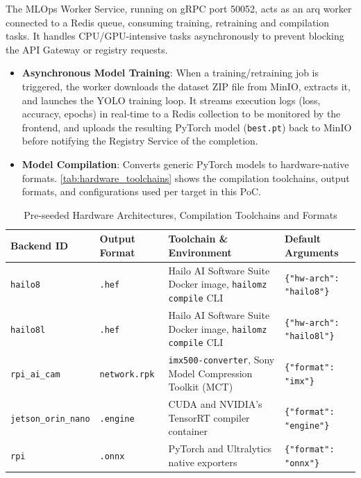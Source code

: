 The \gls{MLOps} Worker Service, running on \gls{gRPC} port 50052, acts as an arq worker connected to a Redis queue, consuming training, retraining and compilation tasks. It handles \gls{CPU}/\gls{GPU}-intensive tasks asynchronously to prevent blocking the \gls{API} Gateway or registry requests.

\begin{itemize}
    \item \textbf{Asynchronous Model Training}: When a training/retraining job is triggered, the worker downloads the dataset ZIP file from MinIO, extracts it, and launches the YOLO training loop. It streams execution logs (loss, accuracy, epochs) in real-time to a Redis collection to be monitored by the frontend, and uploads the resulting PyTorch model (\texttt{best.pt}) back to MinIO before notifying the Registry Service of the completion.
    
    \item \textbf{Model Compilation}: Converts generic PyTorch models to hardware-native formats. \autoref{tab:hardware_toolchains} shows the compilation toolchains, output formats, and configurations used per target in this \gls{PoC}.
\end{itemize}

\begin{table}[H]
    \centering
    \caption{Pre-seeded Hardware Architectures, Compilation Toolchains and Formats} 
    \label{tab:hardware_toolchains}
    \begin{tabular}{p{}
                    p{}
                    p{}
                    p{}}
        \hline
        \textbf{Backend \gls{ID}} & \textbf{Output Format} & \textbf{Toolchain \& Environment} & \textbf{Default Arguments} \\ \hline
        \texttt{hailo8} & \texttt{.hef} & Hailo \gls{AI} Software Suite Docker image, \texttt{hailomz compile} CLI & \texttt{\{"hw-arch": "hailo8"\}} \\
        \texttt{hailo8l} & \texttt{.hef} & Hailo \gls{AI} Software Suite Docker image, \texttt{hailomz compile} CLI & \texttt{\{"hw-arch": "hailo8l"\}} \\
        \texttt{rpi\_ai\_cam} & \texttt{network.rpk} & \texttt{imx500-converter}, Sony Model Compression Toolkit (MCT) & \texttt{\{"format": "imx"\}} \\
        \texttt{jetson\_orin\_nano} & \texttt{.engine} & CUDA and NVIDIA's TensorRT compiler container & \texttt{\{"format": "engine"\}} \\
        \texttt{rpi} & \texttt{.onnx} & PyTorch and Ultralytics native exporters & \texttt{\{"format": "onnx"\}} \\ \hline
    \end{tabular}
\end{table}

